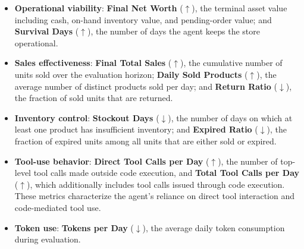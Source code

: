 \begin{itemize}[leftmargin=*]
    \item \textbf{Operational viability}: \textbf{Final Net Worth} ($\uparrow$), the terminal asset value including cash, on-hand inventory value, and pending-order value; and \textbf{Survival Days} ($\uparrow$), the number of days the agent keeps the store operational.

    \item \textbf{Sales effectiveness}: \textbf{Final Total Sales} ($\uparrow$), the cumulative number of units sold over the evaluation horizon; \textbf{Daily Sold Products} ($\uparrow$), the average number of distinct products sold per day; and \textbf{Return Ratio} ($\downarrow$), the fraction of sold units that are returned.

    \item \textbf{Inventory control}: \textbf{Stockout Days} ($\downarrow$), the number of days on which at least one product has insufficient inventory; and \textbf{Expired Ratio} ($\downarrow$), the fraction of expired units among all units that are either sold or expired.

    \item \textbf{Tool-use behavior}: \textbf{Direct Tool Calls per Day} ($\uparrow$), the number of top-level tool calls made outside code execution, and \textbf{Total Tool Calls per Day} ($\uparrow$), which additionally includes tool calls issued through code execution. These metrics characterize the agent's reliance on direct tool interaction and code-mediated tool use.

    \item \textbf{Token use}: \textbf{Tokens per Day} ($\downarrow$), the average daily token consumption during evaluation.
\end{itemize}
